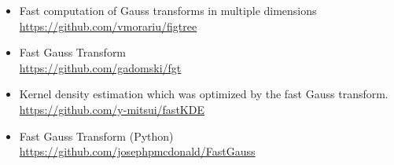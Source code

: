 \documentclass[letter, 10pt]{article}
\begin{document}
\begin{itemize}
\item Fast computation of Gauss transforms in multiple dimensions \\ \url{https://github.com/vmorariu/figtree}
\item Fast Gauss Transform  \\ \url{https://github.com/gadomski/fgt}
\item Kernel density estimation which was optimized by the fast Gauss transform. \\ \url{https://github.com/y-mitsui/fastKDE}

\item Fast Gauss Transform (Python) \\ \url{https://github.com/josephpmcdonald/FastGauss}
\end{itemize}




\end{document}
